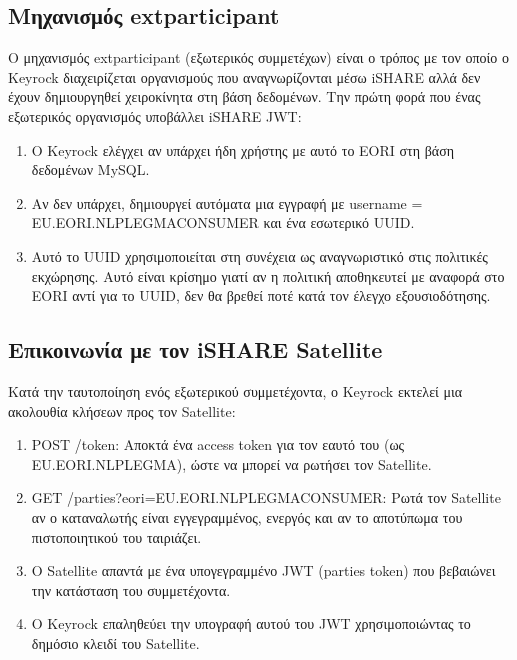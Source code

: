 \subsection{Μηχανισμός \textlatin{extparticipant}}
\label{subsec:extparticipant}

Ο μηχανισμός \textlatin{extparticipant} (εξωτερικός συμμετέχων) είναι
ο τρόπος με τον οποίο ο \textlatin{Keyrock} διαχειρίζεται οργανισμούς
που αναγνωρίζονται μέσω \textlatin{iSHARE} αλλά δεν έχουν δημιουργηθεί
χειροκίνητα στη βάση δεδομένων. Την πρώτη φορά που ένας εξωτερικός
οργανισμός υποβάλλει \textlatin{iSHARE JWT}:

\begin{enumerate}
    \item Ο \textlatin{Keyrock} ελέγχει αν υπάρχει ήδη χρήστης με
    αυτό το \textlatin{EORI} στη βάση δεδομένων \textlatin{MySQL}.
    \item Αν δεν υπάρχει, δημιουργεί αυτόματα μια εγγραφή με
    \textlatin{username} = \textlatin{EU.EORI.NLPLEGMACONSUMER} και ένα εσωτερικό
    \textlatin{UUID}.
    \item Αυτό το \textlatin{UUID}
    χρησιμοποιείται στη συνέχεια ως αναγνωριστικό στις πολιτικές
    εκχώρησης. Αυτό είναι κρίσημο γιατί αν η πολιτική
    αποθηκευτεί με αναφορά στο \textlatin{EORI} αντί για το
    \textlatin{UUID}, δεν θα βρεθεί ποτέ κατά τον έλεγχο
    εξουσιοδότησης.
\end{enumerate}

\subsection{Επικοινωνία με τον \textlatin{iSHARE Satellite}}
\label{subsec:keyrock-satellite}

Κατά την ταυτοποίηση ενός εξωτερικού συμμετέχοντα, ο \textlatin{Keyrock}
εκτελεί μια ακολουθία κλήσεων προς τον \textlatin{Satellite}:

\begin{enumerate}
    \item \textlatin{POST /token}: Αποκτά ένα \textlatin{access token}
    για τον εαυτό του (ως \textlatin{EU.EORI.NLPLEGMA}), ώστε να μπορεί
    να ρωτήσει τον \textlatin{Satellite}.
    \item \textlatin{GET /parties?eori=EU.EORI.NLPLEGMACONSUMER}: Ρωτά
    τον \textlatin{Satellite} αν ο καταναλωτής είναι εγγεγραμμένος,
    ενεργός και αν το αποτύπωμα του πιστοποιητικού του ταιριάζει.
    \item Ο \textlatin{Satellite} απαντά με ένα υπογεγραμμένο
    \textlatin{JWT} (\textlatin{parties token}) που βεβαιώνει την
    κατάσταση του συμμετέχοντα.
    \item Ο \textlatin{Keyrock} επαληθεύει την υπογραφή αυτού του
    \textlatin{JWT} χρησιμοποιώντας το δημόσιο κλειδί του
    \textlatin{Satellite}.
\end{enumerate}

